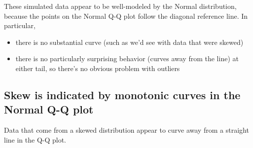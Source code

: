 \documentclass[
]{book}
\providecommand{\tightlist}{%
  \setlength{\itemsep}{0pt}\setlength{\parskip}{0pt}}
\begin{document}
These simulated data appear to be well-modeled by the Normal distribution, because the points on the Normal Q-Q plot follow the diagonal reference line. In particular,

\begin{itemize}
\tightlist
\item
  there is no substantial curve (such as we'd see with data that were skewed)
\item
  there is no particularly surprising behavior (curves away from the line) at either tail, so there's no obvious problem with outliers
\end{itemize}

\hypertarget{skew-is-indicated-by-monotonic-curves-in-the-normal-q-q-plot}{%
\subsection{Skew is indicated by monotonic curves in the Normal Q-Q plot}\label{skew-is-indicated-by-monotonic-curves-in-the-normal-q-q-plot}}

Data that come from a skewed distribution appear to curve away from a straight line in the Q-Q plot.
\end{document}
